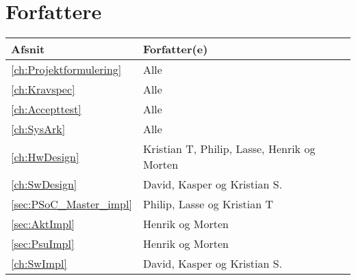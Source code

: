 \chapter*{Forfattere} %
\begin{table}[h]
\centering
\begin{tabularx}{/6}{|l|X|}
	\hline
	Afsnit & Forfatter(e) \\ \hline
	\ref{ch:Projektformulering} \nameref{ch:Projektformulering} & Alle \\ \hline
	\ref{ch:Kravspec} \nameref{ch:Kravspec} & Alle \\ \hline
	\ref{ch:Accepttest} \nameref{ch:Accepttest} & Alle \\ \hline
	\ref{ch:SysArk} \nameref{ch:SysArk} & Alle \\ \hline
	\ref{ch:HwDesign} \nameref{ch:HwDesign} & Kristian T, Philip, Lasse, Henrik og Morten \\ \hline
	\ref{ch:SwDesign} \nameref{ch:SwDesign} & David, Kasper og Kristian S. \\ \hline
 		\ref{sec:PSoC_Master_impl} \nameref{sec:PSoC_Master_impl}  & Philip, Lasse og Kristian T \\ \hline
		\ref{sec:AktImpl} \nameref{sec:AktImpl} & Henrik og Morten \\ \hline
		\ref{sec:PsuImpl} \nameref{sec:PsuImpl} & Henrik og Morten \\ \hline
	\ref{ch:SwImpl} \nameref{ch:SwImpl} & David, Kasper og Kristian S. \\ \hline
\end{tabularx}
\end{table}

\clearpage

\setcounter{page}{1}
\mainmatter










